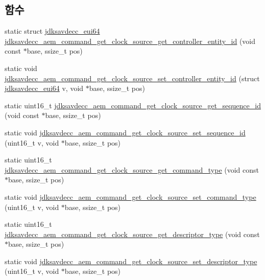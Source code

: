 \subsection*{함수}
\begin{DoxyCompactItemize}
\item 
static struct \hyperlink{structjdksavdecc__eui64}{jdksavdecc\+\_\+eui64} \hyperlink{group__command__get__clock__source_ga6c35231c762b71df4bb61dac807ac20d}{jdksavdecc\+\_\+aem\+\_\+command\+\_\+get\+\_\+clock\+\_\+source\+\_\+get\+\_\+controller\+\_\+entity\+\_\+id} (void const $\ast$base, ssize\+\_\+t pos)
\item 
static void \hyperlink{group__command__get__clock__source_gab9f53e66b603c86bf4599ca26e3492b7}{jdksavdecc\+\_\+aem\+\_\+command\+\_\+get\+\_\+clock\+\_\+source\+\_\+set\+\_\+controller\+\_\+entity\+\_\+id} (struct \hyperlink{structjdksavdecc__eui64}{jdksavdecc\+\_\+eui64} v, void $\ast$base, ssize\+\_\+t pos)
\item 
static uint16\+\_\+t \hyperlink{group__command__get__clock__source_ga320a6e618bd8281afee64c5d09df6a02}{jdksavdecc\+\_\+aem\+\_\+command\+\_\+get\+\_\+clock\+\_\+source\+\_\+get\+\_\+sequence\+\_\+id} (void const $\ast$base, ssize\+\_\+t pos)
\item 
static void \hyperlink{group__command__get__clock__source_ga6fe8fa5e791580b83051d9c649c9a673}{jdksavdecc\+\_\+aem\+\_\+command\+\_\+get\+\_\+clock\+\_\+source\+\_\+set\+\_\+sequence\+\_\+id} (uint16\+\_\+t v, void $\ast$base, ssize\+\_\+t pos)
\item 
static uint16\+\_\+t \hyperlink{group__command__get__clock__source_ga8526a239fb0fdc6c7f8e2891507085de}{jdksavdecc\+\_\+aem\+\_\+command\+\_\+get\+\_\+clock\+\_\+source\+\_\+get\+\_\+command\+\_\+type} (void const $\ast$base, ssize\+\_\+t pos)
\item 
static void \hyperlink{group__command__get__clock__source_gab1d77ff9e6d639e7448f2384eb92afed}{jdksavdecc\+\_\+aem\+\_\+command\+\_\+get\+\_\+clock\+\_\+source\+\_\+set\+\_\+command\+\_\+type} (uint16\+\_\+t v, void $\ast$base, ssize\+\_\+t pos)
\item 
static uint16\+\_\+t \hyperlink{group__command__get__clock__source_ga47d816eb89c4b3bef9225f2ad91a7316}{jdksavdecc\+\_\+aem\+\_\+command\+\_\+get\+\_\+clock\+\_\+source\+\_\+get\+\_\+descriptor\+\_\+type} (void const $\ast$base, ssize\+\_\+t pos)
\item 
static void \hyperlink{group__command__get__clock__source_ga01a3ffdc1b579aa1a4fbeb1fc86f80dd}{jdksavdecc\+\_\+aem\+\_\+command\+\_\+get\+\_\+clock\+\_\+source\+\_\+set\+\_\+descriptor\+\_\+type} (uint16\+\_\+t v, void $\ast$base, ssize\+\_\+t pos)

\end{DoxyCompactItemize}
